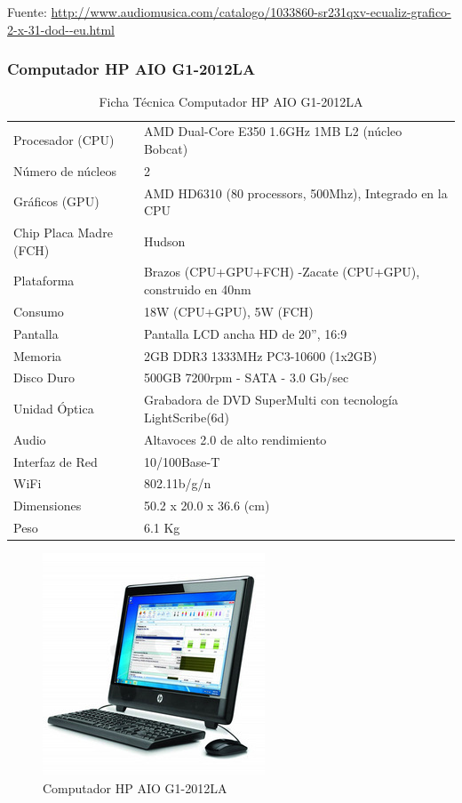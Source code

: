 Fuente: \url{http://www.audiomusica.com/catalogo/1033860-sr231qxv-ecualiz-grafico-2-x-31-dod--eu.html}

\newpage
\subsubsection*{Computador HP AIO G1-2012LA}

\begin{table}[htb!]
\centering
\begin{tabular}{|l|l|}
\hline
Procesador (CPU) &AMD Dual-Core E350 1.6GHz 1MB L2 (núcleo Bobcat) \\
Número de núcleos & 2 \\
Gráficos (GPU) & AMD HD6310 (80 processors, 500Mhz), Integrado en la CPU \\
Chip Placa Madre (FCH) &  Hudson \\
Plataforma & Brazos (CPU+GPU+FCH) -Zacate (CPU+GPU), construido en 40nm \\ 
Consumo & 18W (CPU+GPU), 5W (FCH) \\
Pantalla & Pantalla LCD ancha HD de 20'', 16:9 \\
Memoria & 2GB DDR3 1333MHz PC3-10600 (1x2GB) \\
Disco Duro & 500GB 7200rpm - SATA - 3.0 Gb/sec \\
Unidad Óptica & Grabadora de DVD SuperMulti con tecnología LightScribe(6d)\\
Audio & Altavoces 2.0 de alto rendimiento \\
Interfaz de Red & 10/100Base-T \\
WiFi & 802.11b/g/n \\
Dimensiones & 50.2 x 20.0 x 36.6 (cm) \\
Peso & 6.1 Kg \\
\hline
\end{tabular}
\caption{Ficha Técnica Computador HP AIO G1-2012LA}
\end{table}

\begin{figure}[h!t]
   \centering
  \includegraphics[scale=0.3]{img/computador.jpg}
   \caption{Computador HP AIO G1-2012LA}
   \label{fig:computador}
\end{figure}

